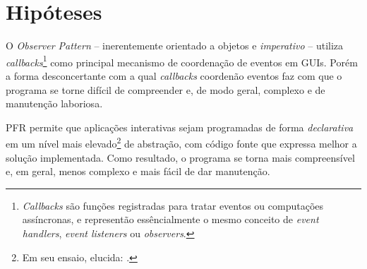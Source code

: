\section{Hipóteses}\label{lhipoteses}

O \emph{Observer Pattern} -- inerentemente orientado a objetos
e \emph{imperativo} -- utiliza \emph{callbacks}\footnote{
  \emph{Callbacks} são funções registradas para tratar eventos
  ou computações assíncronas, e representão essêncialmente o
  mesmo conceito de \emph{event handlers}, \emph{event
  listeners} ou \emph{observers}.
}
como principal mecanismo de coordenação de eventos em GUIs.
Porém a forma desconcertante com a qual \emph{callbacks}
coordenão eventos faz com que o programa se torne difícil
de compreender e, de modo geral, complexo e de
manutenção laboriosa.

PFR permite que aplicações interativas sejam programadas de forma
\emph{declarativa} em um nível mais elevado\footnote{
  Em seu ensaio,  elucida:
  .
}
de abstração, com código fonte que expressa melhor a
solução implementada.
Como resultado, o programa se torna mais compreensível e,
em geral, menos complexo e mais fácil de dar manutenção.

